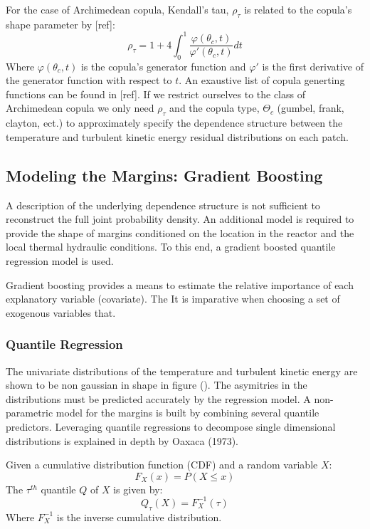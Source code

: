 For the case of Archimedean copula, Kendall's tau, $\rho_\tau$ is
related to the copula's shape parameter by [ref]:
\begin{equation}
\rho_\tau = 1 + 4 \int_0^1 \frac{\varphi(\theta_c,t)}{\varphi'(\theta_c, t)}dt
\end{equation}
Where $\varphi(\theta_c, t)$ is the copula's generator function and $\varphi'$ is the first derivative of the generator function with respect to $t$.  An exaustive list of copula generting functions can be found in [ref].
If we restrict ourselves to the class of Archimedean copula we only need $\rho_\tau$ and the copula type, $\Theta_c$ (gumbel, frank, clayton, ect.) to approximately specify the dependence structure between the temperature and turbulent kinetic energy residual distributions on each patch.

\subsection{Modeling the Margins: Gradient Boosting}

A description of the underlying dependence structure is not sufficient to reconstruct the full joint probability density.  An additional model is required to provide the shape of margins conditioned on the location in the reactor and the local thermal hydraulic conditions.  To this end, a gradient boosted quantile regression model is used.

Gradient boosting provides a means to estimate the relative importance of each explanatory variable (covariate).  The 
It is imparative when choosing a set of exogenous variables that.

\subsubsection{Quantile Regression}

The univariate distributions of the temperature and turbulent kinetic energy are shown to be non gaussian in shape in figure ().  The asymitries in the distributions must be predicted accurately by the regression model.  A non-parametric model for the margins is built by combining several quantile predictors.  Leveraging quantile regressions to decompose single dimensional distributions is explained in depth by Oaxaca (1973).

Given a cumulative distribution function (CDF) and a random variable $X$:
\begin{equation}
F_X(x) = P(X \leq x)
\end{equation}
The $\tau^{th}$ quantile $Q$ of $X$ is given by:
\begin{equation}
Q_\tau(X) = F_X^{-1}(\tau)
\end{equation}
Where $F_X^{-1}$ is the inverse cumulative distribution.

